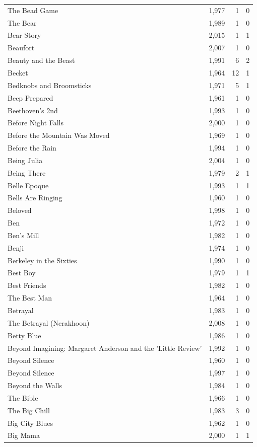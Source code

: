 \begin{tabular}{lrrr}
The Bead Game & 1,977 & 1 & 0 \\
The Bear & 1,989 & 1 & 0 \\
Bear Story & 2,015 & 1 & 1 \\
Beaufort & 2,007 & 1 & 0 \\
Beauty and the Beast & 1,991 & 6 & 2 \\
Becket & 1,964 & 12 & 1 \\
Bedknobs and Broomsticks & 1,971 & 5 & 1 \\
Beep Prepared & 1,961 & 1 & 0 \\
Beethoven's 2nd & 1,993 & 1 & 0 \\
Before Night Falls & 2,000 & 1 & 0 \\
Before the Mountain Was Moved & 1,969 & 1 & 0 \\
Before the Rain & 1,994 & 1 & 0 \\
Being Julia & 2,004 & 1 & 0 \\
Being There & 1,979 & 2 & 1 \\
Belle Epoque & 1,993 & 1 & 1 \\
Bells Are Ringing & 1,960 & 1 & 0 \\
Beloved & 1,998 & 1 & 0 \\
Ben & 1,972 & 1 & 0 \\
Ben's Mill & 1,982 & 1 & 0 \\
Benji & 1,974 & 1 & 0 \\
Berkeley in the Sixties & 1,990 & 1 & 0 \\
Best Boy & 1,979 & 1 & 1 \\
Best Friends & 1,982 & 1 & 0 \\
The Best Man & 1,964 & 1 & 0 \\
Betrayal & 1,983 & 1 & 0 \\
The Betrayal (Nerakhoon) & 2,008 & 1 & 0 \\
Betty Blue & 1,986 & 1 & 0 \\
Beyond Imagining: Margaret Anderson and the 'Little Review' & 1,992 & 1 & 0 \\
Beyond Silence & 1,960 & 1 & 0 \\
Beyond Silence & 1,997 & 1 & 0 \\
Beyond the Walls & 1,984 & 1 & 0 \\
The Bible & 1,966 & 1 & 0 \\
The Big Chill & 1,983 & 3 & 0 \\
Big City Blues & 1,962 & 1 & 0 \\
Big Mama & 2,000 & 1 & 1 \\

\end{tabular}

